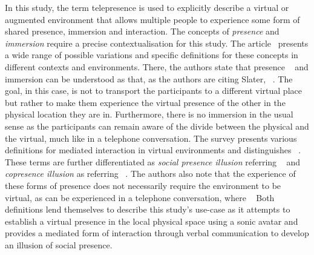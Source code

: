 In this study, the term telepresence is used to explicitly describe a virtual or augmented environment that allows multiple people to experience some form of shared presence, immersion and interaction.
The concepts of \emph{presence} and \emph{immersion} require a precise contextualisation for this study.
The article~ presents a wide range of possible variations and specific definitions for these concepts in different contexts and environments.
There, the authors state that presence ~\parencite[2]{surveyOfPresence} and immersion can be understood as  that, as the authors are citing Slater, ~\parencite[3]{surveyOfPresence}.
The goal, in this case, is not to transport the participants to a different virtual place but rather to make them experience the virtual presence of the other in the physical location they are in.
Furthermore, there is no immersion in the usual sense as the participants can remain aware of the divide between the physical and the virtual, much like in a telephone conversation.
The survey presents various definitions for mediated interaction in virtual environments and distinguishes ~\parencite[4]{surveyOfPresence}.
These terms are further differentiated as \emph{social presence illusion} referring ~\parencite[4]{surveyOfPresence} and \emph{copresence illusion} as referring ~\parencite[5]{surveyOfPresence}.
The authors also note that the experience of these forms of presence does not necessarily require the environment to be virtual, as can be experienced in a telephone conversation, where ~\parencite[5]{surveyOfPresence}
Both definitions lend themselves to describe this study's use-case as it attempts to establish a virtual presence in the local physical space using a sonic avatar and provides a mediated form of interaction through verbal communication to develop an illusion of social presence.

